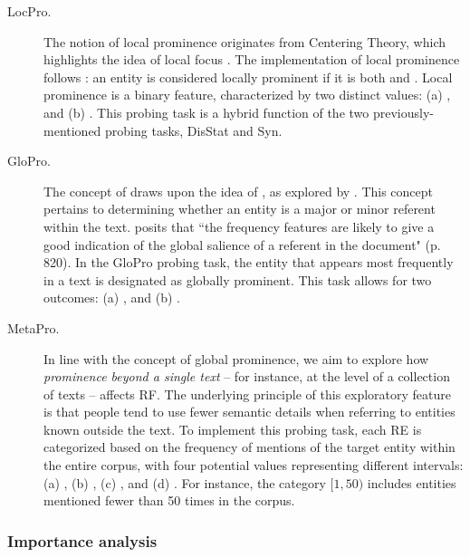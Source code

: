 \begin{description}
	
	\item[LocPro.] The notion of local prominence originates from Centering Theory, which highlights the idea of local focus \citep{grosz1995centering}. The implementation of local prominence follows \citet{henschel2000pronominalization}: an entity is considered locally prominent if it is both  and . Local prominence is a binary feature, characterized by two distinct values:  (a) , and (b) . This probing task is a hybrid function of the two previously-mentioned probing tasks, DisStat and Syn. 
	
	\item[GloPro.] The concept of  draws upon the idea of , as explored by \citet{siddharthan2011information}. This concept pertains to determining whether an entity is a major or minor referent within the text. \citet{siddharthan2011information} posits that ``the frequency features are likely to give a good indication of the global salience of a referent in the document" (p. 820). In the GloPro probing task, the entity that appears most frequently in a text is designated as globally prominent. This task allows for two outcomes: (a) , and (b) .
	
	\item[MetaPro.] In line with the concept of global prominence, we aim to explore how \emph{prominence beyond a single text} -- for instance, at the level of a collection of texts -- affects RF. The underlying principle of this exploratory feature is that people tend to use fewer semantic details when referring to entities known outside the text.
	To implement this probing task, each RE is categorized based on the frequency of mentions of the target entity within the entire \webnlg corpus, with four potential values representing different intervals: (a) \val{[1,50)}, (b) \val{[50,150)}, (c) \val{[150,290)}, and (d) \val{[290,\infty)}. For instance, the category $[1, 50)$ includes entities mentioned fewer than 50 times in the corpus.
	
\end{description}

\subsubsection{Importance analysis} \label{sec:importance}

